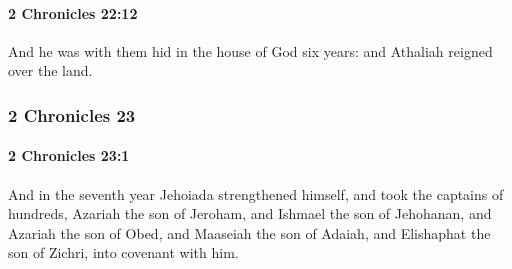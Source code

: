 		\paragraph{2 Chronicles 22:12} %
			\label{2CHRONICLES-22-12}

			And he was with them hid in the house of God six years: and Athaliah reigned over the land.

	\subsubsection{2 Chronicles 23} %
		\label{2CHRONICLES-23}

		\paragraph{2 Chronicles 23:1} %
			\label{2CHRONICLES-23-1}

			And in the seventh year Jehoiada strengthened himself, and took the captains of hundreds, Azariah the son of Jeroham, and Ishmael the son of Jehohanan, and Azariah the son of Obed, and Maaseiah the son of Adaiah, and Elishaphat the son of Zichri, into covenant with him.

